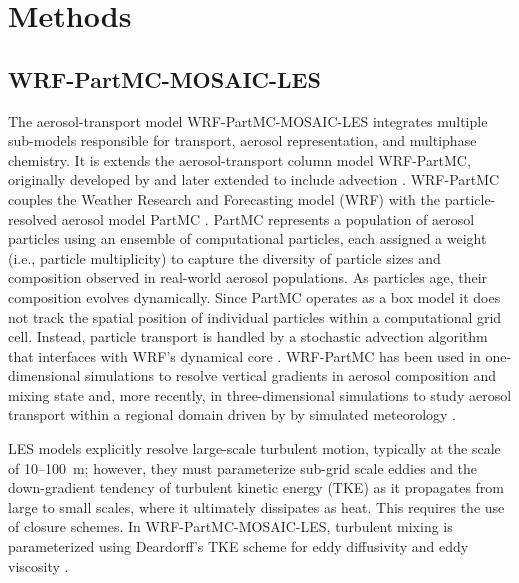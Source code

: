 \documentclass[journal abbreviation, manuscript]{copernicus}
\begin{document}
\section{Methods}

\subsection{WRF-PartMC-MOSAIC-LES}

The aerosol-transport model WRF-PartMC-MOSAIC-LES integrates multiple
sub-models responsible for transport, aerosol representation, and
multiphase chemistry. It is extends the aerosol-transport column model
WRF-PartMC, originally developed by \citet{curtis_single-column_2017}
and later extended to include advection
\citep{gmd-17-8399-2024}. WRF-PartMC couples the Weather Research and
Forecasting model (WRF) \citep{skamarock_description_2008} with the
particle-resolved aerosol model PartMC
\citep{riemer_simulating_2009}. PartMC represents a population of
aerosol particles using an ensemble of computational particles, each
assigned a weight (i.e., particle multiplicity) to capture the
diversity of particle sizes and composition observed in real-world
aerosol populations. As particles age, their composition evolves
dynamically. Since PartMC operates as a box model it does not track
the spatial position of individual particles within a computational
grid cell. Instead, particle transport is handled by a stochastic
advection algorithm that interfaces with WRF's dynamical core
\citep{gmd-17-8399-2024}. WRF-PartMC has been used in one-dimensional
simulations to resolve vertical gradients in aerosol composition and
mixing state \citep {curtis_single-column_2017} and, more recently, in
three-dimensional simulations to study aerosol transport within a
regional domain driven by by simulated meteorology
\citep{gmd-17-8399-2024}.

LES models explicitly resolve large-scale turbulent motion, typically
at the scale of 10--100~m; however, they must parameterize sub-grid
scale eddies and the down-gradient tendency of turbulent kinetic
energy (TKE) as it propagates from large to small scales, where it
ultimately dissipates as heat. This requires the use of closure
schemes. In WRF-PartMC-MOSAIC-LES, turbulent mixing is parameterized
using Deardorff's TKE scheme for eddy diffusivity and eddy viscosity
\citep{deardorff_stratocumulus-capped_1980}.
\end{document}
